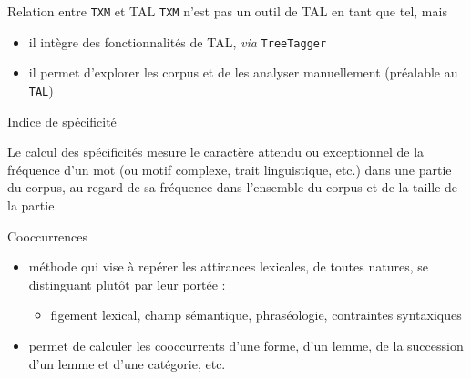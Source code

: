 \documentclass[xetex,xcolor={table,usenames,dvipsnames}]{beamer}
\begin{document}
\begin{frame}{Relation entre \texttt{TXM} et \textsc{TAL}}
	\texttt{TXM} n’est pas un outil de \textsc{TAL} en tant que tel, mais 
	\begin{itemize}
		\item il intègre des fonctionnalités de \textsc{TAL}, \textit{via} \texttt{TreeTagger}
		\item il permet d’explorer les corpus et de les analyser manuellement (préalable au \texttt{TAL})
	\end{itemize}
\end{frame}



\begin{frame}{Indice de spécificité}
	\begin{block}{\vspace{-6mm}}
		\justifying
		Le calcul des spécificités \citep{lafon1980variabilite} mesure le caractère attendu ou exceptionnel de la fréquence
	d'un mot (ou motif complexe, trait linguistique, etc.) dans une partie du corpus, au regard de sa fréquence dans l’ensemble du corpus et de la taille de la partie.
	\end{block}
	\begin{flushright}
		\small
		\citep{pincemin2022semantique}
	\end{flushright}
\end{frame}

\begin{frame}{Cooccurrences}
	\begin{itemize}
		\item méthode qui vise à repérer les attirances lexicales, de toutes natures, se distinguant plutôt par leur portée :
		\begin{itemize}
		\item figement lexical, champ sémantique,
		phraséologie, contraintes syntaxiques
		\end{itemize} 
		\item permet de calculer les cooccurrents d'une forme, d'un lemme, de la succession d'un lemme et d'une catégorie, etc.
	\end{itemize}
\end{frame}
\end{document}
